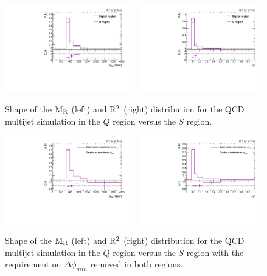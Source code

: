 \begin{figure}[htbp]
\centering
\includegraphics[width=0.48\textwidth]{figures/razor_selection/shapeplots/MR_comparison_QCD_SIG}
~
\includegraphics[width=0.48\textwidth]{figures/razor_selection/shapeplots/R2_comparison_QCD_SIG}
\caption{Shape of the $\mathrm{M_R}$ (left) and $\mathrm{R^2}$ (right) distribution for the QCD multijet simulation
in the $Q$ region versus the $S$ region. 
\label{fig:boost_Q_region_shape}}
\end{figure}

\begin{figure}[htbp]
\centering
\includegraphics[width=0.48\textwidth]
{figures/razor_selection/shapeplots/MR_comparison_QCD_SIG_no_deltaphimin}
~
\includegraphics[width=0.48\textwidth]
{figures/razor_selection/shapeplots/R2_comparison_QCD_SIG_no_deltaphimin}
\caption{Shape of the $\mathrm{M_R}$ (left) and $\mathrm{R^2}$ (right) distribution for the QCD multijet simulation
in the $Q$ region versus the $S$ region with the requirement on  $\Delta\phi_{min}$ removed in both
regions. 
\label{fig:boost_Q_region_shape_no_mindeltaphi}}
\end{figure}

